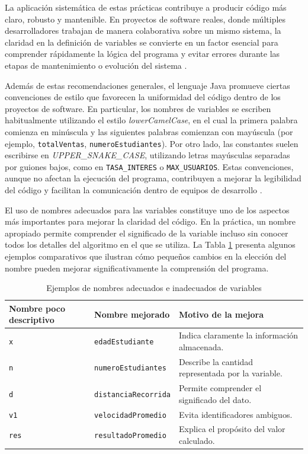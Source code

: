 \documentclass[12pt,twoside]{book}
\begin{document}
						\noindent
						La aplicación sistemática de estas prácticas contribuye a producir código más claro, robusto y mantenible. En proyectos de software reales, donde múltiples desarrolladores trabajan de manera colaborativa sobre un mismo sistema, la claridad en la definición de variables se convierte en un factor esencial para comprender rápidamente la lógica del programa y evitar errores durante las etapas de mantenimiento o evolución del sistema \cite{Pressman2019Software,Sommerville2015Software}.
						
						Además de estas recomendaciones generales, el lenguaje Java promueve ciertas convenciones de estilo que favorecen la uniformidad del código dentro de los proyectos de software. En particular, los nombres de variables se escriben habitualmente utilizando el estilo \textit{lowerCamelCase}, en el cual la primera palabra comienza en minúscula y las siguientes palabras comienzan con mayúscula (por ejemplo, \texttt{totalVentas}, \texttt{numeroEstudiantes}). Por otro lado, las constantes suelen escribirse en \textit{UPPER\_SNAKE\_CASE}, utilizando letras mayúsculas separadas por guiones bajos, como en \texttt{TASA\_INTERES} o \texttt{MAX\_USUARIOS}. Estas convenciones, aunque no afectan la ejecución del programa, contribuyen a mejorar la legibilidad del código y facilitan la comunicación dentro de equipos de desarrollo \cite{Sebesta2018Concepts,Pierce2002Types}.
						
						El uso de nombres adecuados para las variables constituye uno de los aspectos más importantes para mejorar la claridad del código. En la práctica, un nombre apropiado permite comprender el significado de la variable incluso sin conocer todos los detalles del algoritmo en el que se utiliza. La Tabla \ref{tab:variables_buenas_practicas} presenta algunos ejemplos comparativos que ilustran cómo pequeños cambios en la elección del nombre pueden mejorar significativamente la comprensión del programa.
						
						\begin{table}[H]
							\centering
							\caption{Ejemplos de nombres adecuados e inadecuados de variables}
							\label{tab:variables_buenas_practicas}
							\small
							\begin{tabularx}{\textwidth}{X X X}
								\toprule
								\textbf{Nombre poco descriptivo} & \textbf{Nombre mejorado} & \textbf{Motivo de la mejora} \\
								\midrule
								\texttt{x} & \texttt{edadEstudiante} & Indica claramente la información almacenada. \\
								\texttt{n} & \texttt{numeroEstudiantes} & Describe la cantidad representada por la variable. \\
								\texttt{d} & \texttt{distanciaRecorrida} & Permite comprender el significado del dato. \\
								\texttt{v1} & \texttt{velocidadPromedio} & Evita identificadores ambiguos. \\
								\texttt{res} & \texttt{resultadoPromedio} & Explica el propósito del valor calculado. \\
								\bottomrule
							\end{tabularx}
						\end{table}
						
\end{document}
